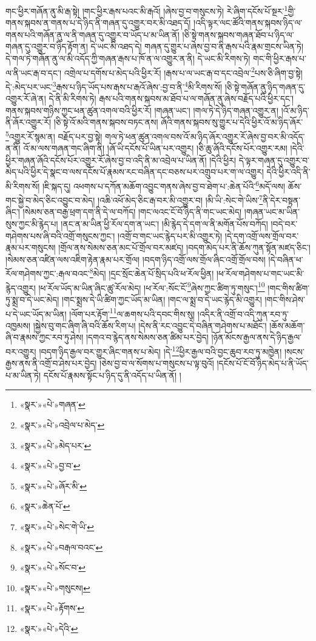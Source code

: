 གང་ཕྱིར་གཞོན་ནུ་མི་རྒ་སྟེ། །གང་ཕྱིར་རྒས་པའང་མི་རྒའོ། །ཞེས་བྱ་བ་གསུངས་ཏེ། རེ་ཞིག་དངོས་པོ་སྔར་\footnote{«སྣར་»«པེ་»གཞན་}གྱི་གནས་སྐབས་ན་གནས་པ་དེ་ཉིད་ནི་གཞན་དུ་འགྱུར་བར་མི་འཐད་དོ། །འདི་ལྟར་ལང་ཚོའི་གནས་སྐབས་ཉིད་ལ་གནས་པའི་གཞོན་ནུ་ལ་ནི་གཞན་དུ་འགྱུར་བ་ཡོད་པ་མ་ཡིན་ནོ། །ཅི་སྟེ་གནས་སྐབས་གཞན་ཐོབ་པ་ཉིད་ལ་གཞན་དུ་འགྱུར་བ་ཉིད་རྟོག་ན། དེ་ཡང་མི་འཐད་དེ། གཞན་དུ་གྱུར་པ་ཞེས་བྱ་བ་ནི་རྒས་པའི་རྣམ་གྲངས་ཡིན་ཏེ། དེ་གལ་ཏེ་གཞོན་ནུ་ལ་མི་འདོད་ཀྱི་གཞན་རྒས་པ་ཁོ་ན་ལ་འགྱུར་ན་ནི། དེ་ཡང་མི་རིགས་ཏེ། གང་གི་ཕྱིར་རྒས་པ་ལ་ནི་ཡང་རྒ་བ་དང་། འགྲེལ་པ་དགོས་པ་མེད་པའི་ཕྱིར་རོ། །རྒས་པ་ལ་ཡང་རྒ་བ་དང་འབྲེལ་\footnote{«སྣར་»«པེ་»འབྲེལ་པ་མེད་}པས་ཅི་ཞིག་བྱ་སྟེ། དེ་:མེད་པར་ཡང་\footnote{«སྣར་»«པེ་»མེད་པར་}རྒས་པ་ཉིད་ཡོད་པས་རྒས་པ་རྒའོ་ཞེས་:བྱ་བ་ནི་\footnote{«སྣར་»«པེ་»བྱ་བ་}མི་རིགས་སོ། །ཅི་སྟེ་གཞོན་ནུ་ཉིད་གཞན་དུ་འགྱུར་རོ་ཞེ་ན། དེ་ནི་མི་རིགས་ཏེ། རྒས་པའི་གནས་སྐབས་མ་ཐོབ་པ་ལ་གཞོན་ནུ་ཞེས་བརྗོད་པའི་ཕྱིར་དང་། གནས་སྐབས་གཉིས་ཀྱང་ཕན་ཚུན་འགལ་བའི་ཕྱིར་རོ། །གཞན་ཡང་། །གལ་ཏེ་དེ་ཉིད་གཞན་འགྱུར་ན། །འོ་མ་ཉིད་ནི་ཞོར་འགྱུར་རོ། །ཅི་སྟེ་འོ་མའི་གནས་སྐབས་བཏང་ནས། ཞོའི་གནས་སྐབས་སུ་གྱུར་པ་དེའི་ཕྱིར་འོ་མ་ཉིད་ཞོར་\footnote{«སྣར་»«པེ་»ཞོར་མི་}འགྱུར་རོ་སྙམ་ན། བརྗོད་པར་བྱ་སྟེ། གལ་ཏེ་ཕན་ཚུན་འགལ་བས་འོ་མ་ཉིད་ཞོར་འགྱུར་རོ་ཞེས་བྱ་བར་མི་འདོད་ན་ནི། འོ་མ་ལས་གཞན་གང་ཞིག་ནི། །ཞོ་ཡི་དངོས་པོ་ཡིན་པར་འགྱུར། །ཅི་ཆུ་ཞོའི་དངོས་པོར་འགྱུར་རམ། །དེའི་ཕྱིར་གཞན་ཞོའི་དངོས་པོར་འགྱུར་རོ་ཞེས་བྱ་བ་འདི་ནི་མ་འབྲེལ་པ་ཡིན་ནོ། །དེའི་ཕྱིར། དེ་ལྟར་གཞན་དུ་འགྱུར་བ་མེད་པའི་ཕྱིར་དེ་སྣང་བ་ལས་དངོས་པོ་རྣམས་རང་བཞིན་དང་བཅས་པར་འགྲུབ་པར་ག་ལ་འགྱུར། དེའི་ཕྱིར་འདི་ནི་མི་རིགས་སོ། །ཇི་སྐད་དུ། འཕགས་པ་དཀོན་མཆོག་འབྱུང་གནས་ཞེས་བྱ་བ་ཐེག་པ་:ཆེན་པོའི་\footnote{«སྣར་»ཆེན་པོ་}མདོ་ལས། ཆོས་གང་སྐྱེ་བ་མེད་ཅིང་འབྱུང་བ་མེད། །འཆི་འཕོ་མེད་ཅིང་རྒ་བར་མི་འགྱུར་བ། །མི་ཡི་:སེང་གེ་ཡིས་\footnote{«སྣར་»«པེ་»སེང་གེ་ཡི་}ནི་དེར་བསྟན་ཞིང་། །སེམས་ཅན་བརྒྱ་ཕྲག་དག་ནི་དེ་ལ་བཀོད། །གང་ལའང་ངོ་བོ་ཉིད་ནི་གང་ཡང་མེད། །གཞན་ཡང་མ་ཡིན་སུས་ཀྱང་མི་རྙེད་པ། །ནང་ན་མ་ཡིན་ཕྱི་རོལ་དག་ན་ཡང་། །མི་རྙེད་དེ་དག་ལ་ནི་མགོན་པོས་བཀོད། །བདེ་བར་གཤེགས་པས་ཞི་བའི་འགྲོ་གསུངས་ཀྱང་། །འགྲོ་བ་གང་ཡང་རྙེད་པར་མི་འགྱུར་ཏེ། །དེ་དག་འགྲོ་ལས་གྲོལ་བར་རྣམ་པར་གསུངས། །གྲོལ་ནས་སེམས་ཅན་མང་པོ་གྲོལ་བར་མཛད། །བདག་མེད་པར་ནི་ཆོས་ཀུན་སྟོན་མཛད་ཅིང་། །སེམས་ཅན་འཛིན་ལས་འཇིག་རྟེན་རྣམ་པར་གྲོལ། །བདག་ཉིད་འགྲོ་ལས་གྲོལ་ཞིང་འགྲོ་གྲོལ་བས། །དེ་བཞིན་ཕ་རོལ་གཤེགས་ཀྱང་:རྒལ་བའང་\footnote{«སྣར་»«པེ་»བརྒལ་བའང་}མེད། །དྲང་སྲོང་ཆེན་པོ་སྲིད་པའི་ཕ་རོལ་ཕྱིན། །ཕ་རོལ་གཤེགས་པ་གང་ཡང་མི་རྙེད་འགྱུར། །ཕ་རོལ་ཡོད་མ་ཡིན་ཞིང་ཚུ་རོལ་མེད། །ཕ་རོལ་:སོང་ངོ་\footnote{«སྣར་»«པེ་»སོང་བ་}ཞེས་ཀྱང་ཚིག་ཏུ་གསུང་།\footnote{«སྣར་»«པེ་»གསུངས།} །གང་གིས་ཚིག་ཏུ་སྨྲ་བ་དེ་ཡང་མེད། །གང་སྨྲས་དེ་ཡི་ཚིག་ཀྱང་ཡོད་མ་ཡིན། །གང་ལ་སྨྲ་བ་དེ་ཡང་རྙེད་མི་འགྱུར། །གང་གིས་ཤེས་པ་དེ་ཡང་ཡོད་མ་ཡིན། །ལོག་པར་རྟོག་\footnote{«སྣར་»«པེ་»རྟོགས་}ལ་ཆགས་པའི་དབང་གིས་སུ། །འདིར་ནི་འགྲོ་བ་འདི་ཀུན་རབ་ཏུ་འཁྱམས། །སྐྱེས་བུ་གང་ཞིག་ཞི་བའི་ཆོས་རིག་པ། །དེས་ནི་རང་འབྱུང་དེ་བཞིན་གཤེགས་པ་མཐོང་། །ཆོས་མཆོག་ཞི་བ་རྣམས་ཀྱང་རབ་ཏུ་ཤེས། །དགའ་བ་རྙེད་ནས་སེམས་ཅན་ཚིམ་པར་བྱེད། །ཉོན་མོངས་རྒྱལ་ནས་དེ་ཉིད་རྒྱལ་བར་འགྱུར། །བདག་ཉིད་རྒྱལ་བར་གྱུར་ཞིང་གནས་པ་མེད། །དེ་\footnote{«སྣར་»«པེ་»དེའི་}ཕྱིར་རྒྱལ་བའི་བྱང་ཆུབ་རབ་ཏུ་མཁྱེན། །སངས་རྒྱས་ནས་ནི་འགྲོ་བ་ཤེས་པར་བྱེད། །ཅེས་བྱ་བ་ལ་སོགས་པ་གསུངས་པ་ལྟ་བུའོ། །དངོས་པོ་ངོ་བོ་ཉིད་མེད་པ་ནི་ཡོད་པ་མ་ཡིན་ཏེ། དངོས་པོ་རྣམས་སྟོང་པ་ཉིད་དུ་ནི་འདོད་པ་ཡིན་ནོ། །
